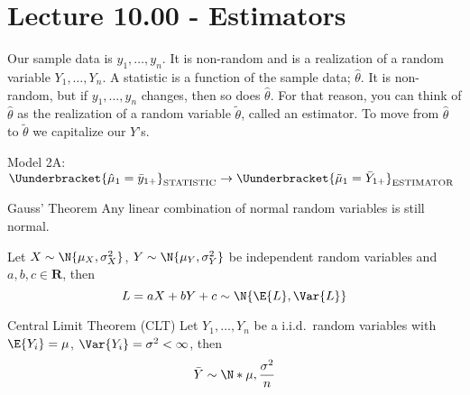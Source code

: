\section{Lecture 10.00 - Estimators}
Our sample data is $ y_1,\ldots,y_n $.
It is non-random and is a realization of a random
variable $ Y_1,\ldots,Y_n $. A statistic is a function
of the sample data; $ \hat{\theta} $. It is non-random,
but if $ y_1,\ldots,y_n $ changes, then so does $ \hat{\theta} $.
For that reason, you can think of $ \hat{\theta} $
as the realization of a random variable $ \tilde{\theta} $,
called an estimator. To move from $ \hat{\theta} $
to $ \tilde{\theta} $ we capitalize our $ Y $'s.

\begin{Example}{}{}
    Model 2A\@:
    $ \displaystyle \Uunderbracket{\hat{\mu}_1=\bar{y}_{1+}}_{\text{STATISTIC}}\to
        \Uunderbracket{\tilde{\mu}_1=\bar{Y}_{1+}}_{\text{ESTIMATOR}} $
\end{Example}
\begin{Theorem}{Gauss' Theorem}{}
    Any linear combination of normal random variables is still normal.
\end{Theorem}
\begin{Example}{}{}
    Let $ X\sim\N{\mu_X,\sigma_X^2} $, $ Y \sim \N{\mu_Y,\sigma^2_Y} $
    be independent random variables and $ a,b,c\in\mathbf{R} $, then
    \[ L=aX+bY+c\sim\N{\E{L},\Var{L}} \]
\end{Example}
\begin{Theorem}{Central Limit Theorem (CLT)}{}
    Let $ Y_1,\ldots,Y_n $ be a i.i.d.\ random variables with
    $ \E{Y_i}=\mu $, $ \Var{Y_i}=\sigma^2<\infty $, then
    \[ \bar{Y} \sim \N*{\mu,\frac{\sigma^2}{n}} \]
\end{Theorem}

